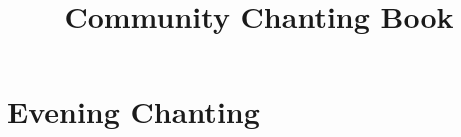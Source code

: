 \documentclass[final]{chantingbook}
\title{Community Chanting Book}
\begin{document}
%
%

\mainmatter


%
%

\part{Evening Chanting}



%
%

%
%
\end{document}
